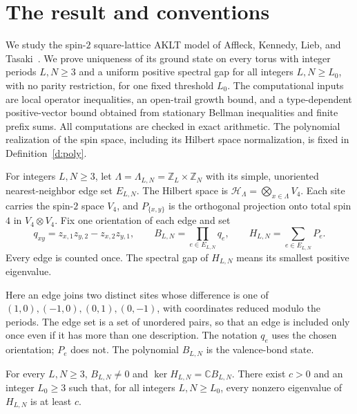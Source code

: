 \section{The result and conventions}\label{s:result}

We study the spin-\(2\) square-lattice AKLT model of Affleck, Kennedy,
Lieb, and Tasaki~\cite{AKLT88,KLT88}. We prove uniqueness of its ground
state on every torus with integer periods \(L,N\ge3\) and a uniform
positive spectral gap for all integers \(L,N\ge L_0\), with no parity
restriction, for one fixed threshold \(L_0\). The computational inputs
are local operator inequalities, an open-trail growth bound, and a
type-dependent positive-vector bound obtained from stationary Bellman
inequalities and finite prefix sums. All computations are checked in
exact arithmetic. The polynomial realization of the spin space,
including its Hilbert space normalization, is fixed in
Definition~\ref{d:poly}.

\begin{definition}\label{d:model}
For integers \(L,N\ge3\), let \(\Lambda=\Lambda_{L,N}=\mathbb Z_L\times\mathbb Z_N\)
with its simple, unoriented nearest-neighbor edge set \(E_{L,N}\).
The Hilbert space is \(\mathcal H_\Lambda=\bigotimes_{x\in\Lambda}V_4\).
Each site carries the spin-\(2\) space \(V_4\), and \(P_{\{x,y\}}\)
is the orthogonal projection onto total spin \(4\) in \(V_4\otimes V_4\).
Fix one orientation of each edge and set
\[
 q_{xy}=z_{x,1}z_{y,2}-z_{x,2}z_{y,1},\qquad
 B_{L,N}=\prod_{e\in E_{L,N}}q_e,\qquad
 H_{L,N}=\sum_{e\in E_{L,N}}P_e.
\]
Every edge is counted once. The spectral gap of \(H_{L,N}\) means its
smallest positive eigenvalue.
\end{definition}

Here an edge joins two distinct sites whose difference is one of
\((1,0),(-1,0),(0,1),(0,-1)\), with coordinates reduced modulo the
periods. The edge set is a set of unordered pairs, so that an edge
is included only once even if it has more than one description.
The notation \(q_e\) uses the chosen orientation; \(P_e\) does not.
The polynomial \(B_{L,N}\) is the valence-bond state.

\begin{theorem}\label{t:main}
For every \(L,N\ge3\), \(B_{L,N}\ne0\) and
\(\ker H_{L,N}=\mathbb C B_{L,N}\).
There exist \(c>0\) and an integer \(L_0\ge3\) such that, for all
integers \(L,N\ge L_0\), every nonzero eigenvalue of \(H_{L,N}\)
is at least \(c\).
\end{theorem}

